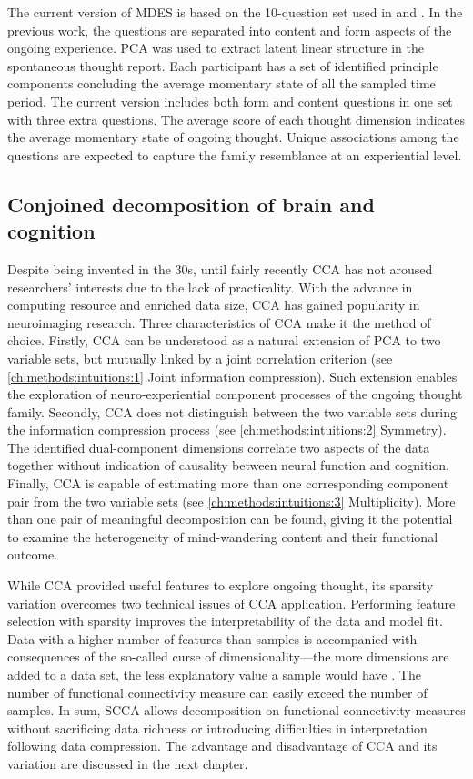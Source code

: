 The current version of MDES is based on the 10-question set used in  and . In the previous work, the questions are separated into content and form aspects of the ongoing experience. PCA was used to extract latent linear structure in the spontaneous thought report. Each participant has a set of identified principle components concluding the average momentary state of all the sampled time period. The current version includes both form and content questions in one set with three extra questions. The average score of each thought dimension indicates the average momentary state of ongoing thought. Unique associations among the questions are expected to capture the family resemblance at an experiential level. 

% 

\subsection{Conjoined decomposition of brain and cognition}

Despite being invented in the 30s, until fairly recently CCA has not aroused researchers' interests due to the lack of practicality. With the advance in computing resource and enriched data size, CCA has gained popularity in neuroimaging research. Three characteristics of CCA make it the method of choice. Firstly, CCA can be understood as a natural extension of PCA to two variable sets, but mutually linked by a joint correlation criterion (see \ref{ch:methods:intuitions:1} Joint information compression). Such extension enables the exploration of neuro-experiential component processes of the ongoing thought family. Secondly, CCA does not distinguish between the two variable sets during the information compression process (see \ref{ch:methods:intuitions:2} Symmetry). The identified dual-component dimensions correlate two aspects of the data together without indication of causality between neural function and cognition. Finally, CCA is capable of estimating more than one corresponding component pair from the two variable sets (see \ref{ch:methods:intuitions:3} Multiplicity). More than one pair of meaningful decomposition can be found, giving it the potential to examine the heterogeneity of mind-wandering content and their functional outcome. 

While CCA provided useful features to explore ongoing thought, its sparsity variation overcomes two technical issues of CCA application. Performing feature selection with sparsity improves the interpretability of the data and model fit. Data with a higher number of features than samples is accompanied with consequences of the so-called curse of dimensionality---the more dimensions are added to a data set, the less explanatory value a sample would have \cite{Domingos2012}. The number of functional connectivity measure can easily exceed the number of samples. In sum, SCCA allows decomposition on functional connectivity measures without sacrificing data richness or introducing difficulties in interpretation following data compression. The advantage and disadvantage of CCA and its variation are discussed in the next chapter.

